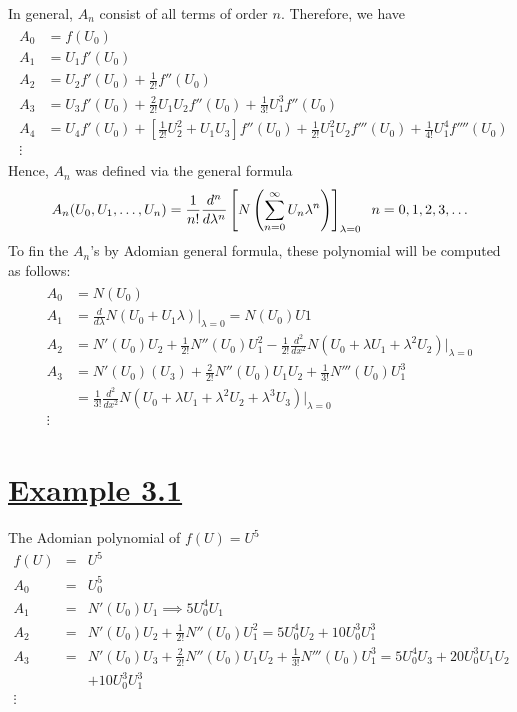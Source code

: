 \documentclass[11pt]{report}
\newcommand{\ubt}[1]{\textbf{\underline{#1}}}
\newcommand{\sps}{\\[0.2cm]}
\newcommand{\NI}{\noindent}
\newcommand{\sprime}{'}
\newcommand{\dprime}{''}
\newcommand{\tprime}{'''}
\newcommand{\example}[1]{\section*{\ubt{Example #1}}}
\begin{document}
	\NI In general, $A_n$ consist of all terms of order $n$. Therefore, we have
	\begin{eqnarray}
		\begin{split}
			A_0 &= f(U_0)\sps
			A_1 &= U_1f\sprime(U_0)\sps
			A_2 &= U_2f\sprime(U_0)+ \frac{1}{2!}f\dprime(U_0)\sps
			A_3 &= U_3f\sprime(U_0) + \frac{2}{2!}U_1U_2f\dprime(U_0)+ \frac{1}{3!}U_1^3f\dprime(U_0)\sps
			A_4 &= U_4f\sprime(U_0) + \left[\frac{1}{2!}U_2^2 + U_1U_3\right]f\dprime(U_0) + \frac{1}{2!}U_1^2U_2f\tprime(U_0) + \frac{1}{4!}U_1^4f''''(U_0)\sps
			\vdots
		\end{split}
	\end{eqnarray}
	Hence, $A_n$ was defined via the general formula
	\begin{eqnarray}
		A_n(U_0,U_1,\ldots,U_n) = \frac{1}{n!}\frac{d^n}{d\lambda^n}\left[  N\left( \sum_{n=0}^\infty U_n\lambda^n \right)  \right]_{\lambda=0} \hspace{.2cm} n=0,1,2,3,\ldots
	\end{eqnarray}
	To fin the $A_n$'s by Adomian general formula, these polynomial will be computed as follows:
	\begin{eqnarray*}
		\begin{split}
			A_0 &= N(U_0)\sps
			A_1 &= \frac{d}{d\lambda}N(U_0+U_1\lambda)\Big|_{\lambda=0} = N(U_0)U1\sps
			A_2 &= N\sprime(U_0)U_2 + \frac{1}{2!}N\dprime(U_0)U_1^2 - \frac{1}{2!}\frac{d^2}{dx^2}N(U_0+\lambda U_1 + \lambda^2 U_2)\Big|_{\lambda=0}\sps
			A_3 &= N\sprime(U_0)(U_3) + \frac{2}{2!}N\dprime(U_0)U_1U_2 + \frac{1}{3!}N\tprime(U_0)U_1^3\\  
			&= \frac{1}{3!}\frac{d^2}{dx^2}N(U_0+\lambda U_1 + \lambda^2U_2 + \lambda^3U_3)\Big|_{\lambda=0}\sps
			\vdots
		\end{split}
	\end{eqnarray*}
	
	\example{3.1}
	The Adomian polynomial of $f(U) = U^5$
	\begin{eqnarray*}
		f(U) &=&U^5\sps
		A_0 &=& U_0^5\sps
		A_1 &=& N\sprime(U_0)U_1 \implies 5U_0^4U_1\sps
		A_2 &=& N\sprime(U_0)U_2 + \frac{1}{2!}N\dprime(U_0)U_1^2  = 5U_0^4U_2+10U_0^3U_1^3\sps
		A_3 &=& N\sprime(U_0)U_3 + \frac{2}{2!}N\dprime(U_0)U_1U_2 + \frac{1}{3!}N\tprime(U_0)U_1^3 = 5U_0^4U_3 + 20U_0^3U_1U_2 \\
		&&+ 10U_0^3U_1^3\sps
		\vdots	
	\end{eqnarray*}
\end{document}
